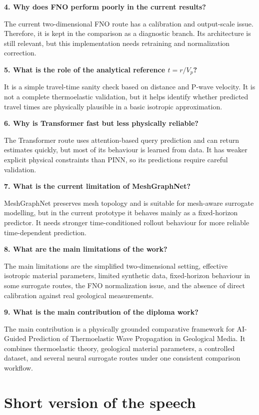 \documentclass[11pt,a4paper]{article}
\begin{document}
\textbf{4. Why does FNO perform poorly in the current results?}

The current two-dimensional FNO route has a calibration and output-scale issue. Therefore, it is kept in the comparison as a diagnostic branch. Its architecture is still relevant, but this implementation needs retraining and normalization correction.

\textbf{5. What is the role of the analytical reference $t=r/V_p$?}

It is a simple travel-time sanity check based on distance and P-wave velocity. It is not a complete thermoelastic validation, but it helps identify whether predicted travel times are physically plausible in a basic isotropic approximation.

\textbf{6. Why is Transformer fast but less physically reliable?}

The Transformer route uses attention-based query prediction and can return estimates quickly, but most of its behaviour is learned from data. It has weaker explicit physical constraints than PINN, so its predictions require careful validation.

\textbf{7. What is the current limitation of MeshGraphNet?}

MeshGraphNet preserves mesh topology and is suitable for mesh-aware surrogate modelling, but in the current prototype it behaves mainly as a fixed-horizon predictor. It needs stronger time-conditioned rollout behaviour for more reliable time-dependent prediction.

\textbf{8. What are the main limitations of the work?}

The main limitations are the simplified two-dimensional setting, effective isotropic material parameters, limited synthetic data, fixed-horizon behaviour in some surrogate routes, the FNO normalization issue, and the absence of direct calibration against real geological measurements.

\textbf{9. What is the main contribution of the diploma work?}

The main contribution is a physically grounded comparative framework for AI-Guided Prediction of Thermoelastic Wave Propagation in Geological Media. It combines thermoelastic theory, geological material parameters, a controlled dataset, and several neural surrogate routes under one consistent comparison workflow.

\newpage
\section*{\color{AcademicNavy}Short version of the speech}
\end{document}
